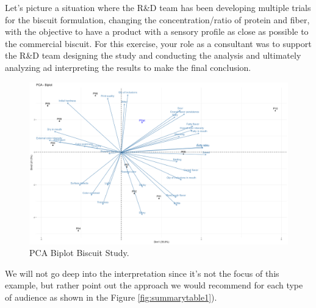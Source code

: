 \documentclass[
]{krantz}
\begin{document}
Let's picture a situation where the R\&D team has been developing multiple trials for the biscuit formulation, changing the concentration/ratio of protein and fiber, with the objective to have a product with a sensory profile as close as possible to the commercial biscuit. For this exercise, your role as a consultant was to support the R\&D team designing the study and conducting the analysis and ultimately analyzing ad interpreting the results to make the final conclusion.

\begin{figure}

{\centering \includegraphics[width=0.9\linewidth]{images/PCA} 

}

\caption{PCA Biplot Biscuit Study.}\label{fig:pca}
\end{figure}

We will not go deep into the interpretation since it's not the focus of this example, but rather point out the approach we would recommend for each type of audience as shown in the Figure \ref{fig:summarytable1}).
\end{document}
